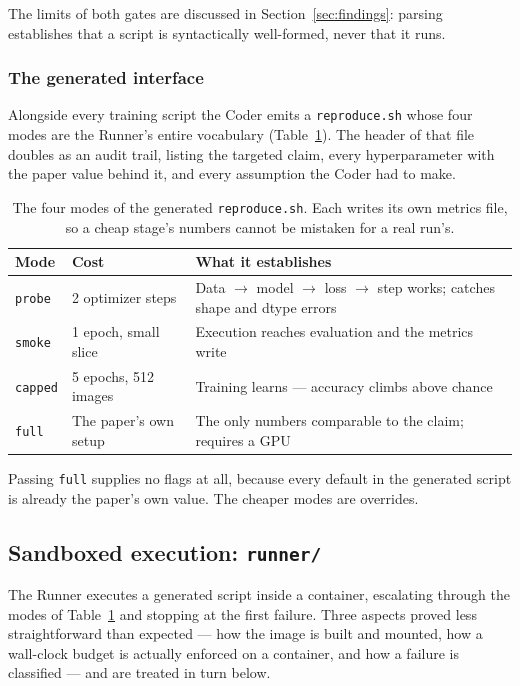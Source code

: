 \documentclass[10pt,twocolumn]{article}
\begin{document}
The limits of both gates are discussed in Section~\ref{sec:findings}: parsing establishes
that a script is syntactically well-formed, never that it runs.

\subsubsection{The generated interface}

Alongside every training script the Coder emits a \texttt{reproduce.sh} whose four modes
are the Runner's entire vocabulary (Table~\ref{tab:modes}). The header of that file
doubles as an audit trail, listing the targeted claim, every hyperparameter with the paper
value behind it, and every assumption the Coder had to make.

\begin{table}[htbp]
\centering
\small
\caption{The four modes of the generated \texttt{reproduce.sh}. Each writes its own
metrics file, so a cheap stage's numbers cannot be mistaken for a real run's.}
\label{tab:modes}
\begin{tabular}{lll}
\toprule
Mode & Cost & What it establishes \\
\midrule
\texttt{probe}  & 2 optimizer steps      & Data $\to$ model $\to$ loss $\to$ step works;
                                           catches shape and dtype errors \\
\texttt{smoke}  & 1 epoch, small slice   & Execution reaches evaluation and the metrics
                                           write \\
\texttt{capped} & 5 epochs, 512 images   & Training learns --- accuracy climbs above
                                           chance \\
\texttt{full}   & The paper's own setup  & The only numbers comparable to the claim;
                                           requires a GPU \\
\bottomrule
\end{tabular}
\end{table}

Passing \texttt{full} supplies no flags at all, because every default in the generated
script is already the paper's own value. The cheaper modes are overrides.

\subsection{Sandboxed execution: \texttt{runner/}}

The Runner executes a generated script inside a container, escalating through the modes of
Table~\ref{tab:modes} and stopping at the first failure. Three aspects proved less
straightforward than expected --- how the image is built and mounted, how a wall-clock
budget is actually enforced on a container, and how a failure is classified --- and are
treated in turn below.
\end{document}
